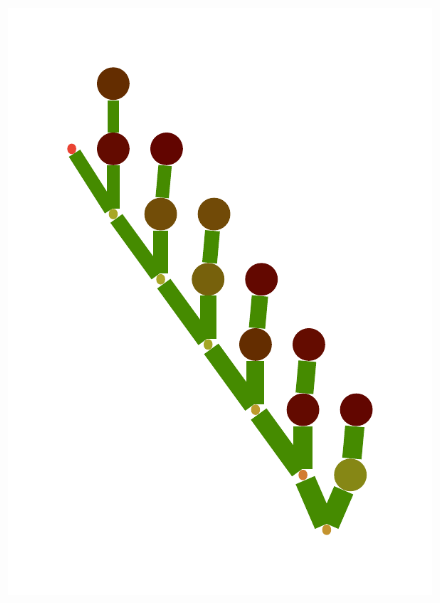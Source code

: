 \documentclass[a4paper,10pt]{article}
\begin{document}
\begin{figure}
{    \includegraphics[scale=.14]{./figures/6-4-vine-induced-3.pdf}
}
\end{figure}
\end{document}
